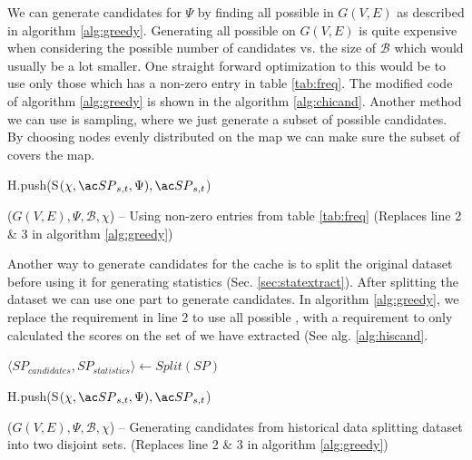 We can generate candidates for $\Psi$ by finding all possible \spath in $G(V,E)$ as described in algorithm \ref{alg:greedy}. Generating all \spath possible on $G(V,E)$ is quite expensive when considering the possible number of candidates vs. the size of $\mathcal{B}$ which would usually be a lot smaller. One straight forward optimization to this would be to use only those \spath which has a non-zero entry in table \ref{tab:freq}. The modified code of algorithm \ref{alg:greedy} is shown in the algorithm \ref{alg:chicand}. Another method we can use is sampling, where we just generate a subset of possible candidates. By choosing nodes evenly distributed on the map we can make sure the subset of \spaths covers the map.

\begin{algorithm} [H!bt]
\dontprintsemicolon
\SetVline

{
    H.push(S$(\chi, \spath_{s,t}, \Psi), \spath_{s,t}$) \;
}

\caption{\salgons($G(V,E), \Psi, \mathcal{B}, \chi$) -- Using non-zero entries from table \ref{tab:freq} (Replaces line 2 \& 3 in algorithm \ref{alg:greedy})}
\label{alg:chicand}
\end{algorithm}


Another way to generate candidates for the cache is to split the original dataset before using it for generating statistics (Sec. \ref{sec:statextract}). 
After splitting the dataset we can use one part to generate candidates. In algorithm \ref{alg:greedy}, we replace the requirement in line 2 to use all possible \spathsns, with a requirement to only calculated the scores on the set of \spaths we have extracted (See alg. \ref{alg:hiscand}.

\begin{algorithm} [H!bt]
\dontprintsemicolon
\SetVline

$\langle SP_{candidates}, SP_{statistics} \rangle \leftarrow Split({SP})$ 

{
    H.push(S$(\chi, \spath_{s,t}, \Psi), \spath_{s,t}$) \;
}

\caption{\salgons($G(V,E), \Psi, \mathcal{B}, \chi$) -- Generating candidates from historical data splitting dataset into two disjoint sets. (Replaces line 2 \& 3 in algorithm \ref{alg:greedy})}
\label{alg:hiscand}
\end{algorithm}

